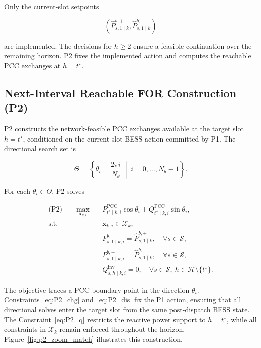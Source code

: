 \documentclass[journal]{IEEEtran}
\begin{document}
Only the current-slot setpoints

\begin{equation}
\label{eq:P1_committed_actions}
\left(
\widehat{P}^{b,+}_{s,1\mid k},
\widehat{P}^{b,-}_{s,1\mid k}
\right)
\end{equation}

are implemented. The decisions for \(h\geq2\) ensure a feasible continuation over the remaining horizon. P2 fixes the implemented action and computes the reachable PCC exchanges at \(h=t^\star\).


\subsection{Next-Interval Reachable FOR Construction (P2)} \label{ssec:for_next_interval}

P2 constructs the network-feasible PCC exchanges available at the target slot \(h=t^\star\), conditioned on the current-slot BESS action committed by P1. The directional search set is 

\begin{equation} 
\label{eq:directions} 
\Theta = \left\{ \theta_i=\frac{2\pi i}{N_\theta} \;\middle|\; i=0,\ldots,N_\theta-1 \right\}. 
\end{equation} 

For each \(\theta_i\in\Theta\), P2 solves 

\begin{subequations} 
\label{eq:P2} \begin{align} \text{(P2)}\qquad \max_{\bm{x}_{k,i}}\quad & P^{\mathrm{PCC}}_{t^\star\mid k,i}\cos\theta_i + Q^{\mathrm{PCC}}_{t^\star\mid k,i}\sin\theta_i, \label{eq:P2_obj} \\ \text{s.t.}\quad & \bm{x}_{k,i}\in\mathcal{X}_{k}, \label{eq:P2_common} \\ & P^{b,+}_{s,1\mid k,i} = \widehat{P}^{b,+}_{s,1\mid k}, \quad \forall s\in\mathcal{S}, \label{eq:P2_chg} \\ & P^{b,-}_{s,1\mid k,i} = \widehat{P}^{b,-}_{s,1\mid k}, \quad \forall s\in\mathcal{S}, \label{eq:P2_dis} \\ & Q^{\mathrm{inv}}_{s,h\mid k,i}=0, \quad \forall s\in\mathcal{S},\ h\in\mathcal{H}\setminus\{t^\star\}. \label{eq:P2_q} 
\end{align} 
\end{subequations} 

The objective traces a PCC boundary point in the direction \(\theta_i\). Constraints~\eqref{eq:P2_chg} and~\eqref{eq:P2_dis} fix the P1 action, ensuring that all directional solves enter the target slot from the same post-dispatch BESS state.  The Constraint~\eqref{eq:P2_q} restricts the reactive power support to \(h=t^\star\), while all constraints in \(\mathcal{X}_{k}\) remain enforced throughout the horizon. Figure~\ref{fig:p2_zoom_match} illustrates this construction.
\end{document}
